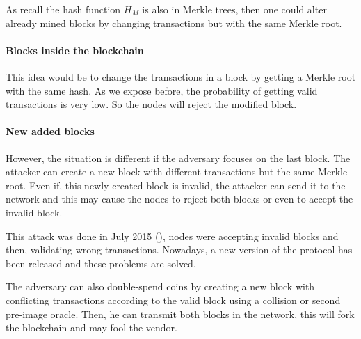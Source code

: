 As recall the hash function $H_M$ is also in Merkle trees, then one could alter already mined blocks by changing transactions but with the same Merkle root.

    \paragraph{Blocks inside the blockchain}

This idea would be to change the transactions in a block by getting a Merkle root with the same hash. As we expose before, the probability of getting valid transactions is very low. So the nodes will reject the modified block.

    \paragraph{New added blocks}

However, the situation is different if the adversary focuses on the last block. The attacker can create a new block with different transactions but the same Merkle root. Even if, this newly created block is invalid, the attacker can send it to the network and this may cause the nodes to reject both blocks or even to accept the invalid block.

This attack was done in July 2015 (\cite{mining_attack}), nodes were accepting invalid blocks and then, validating wrong transactions. Nowadays, a new version of the protocol has been released and these problems are solved. \newline

The adversary can also double-spend coins by creating a new block with conflicting transactions according to the valid block using a collision or second pre-image oracle. Then, he can transmit both blocks in the network, this will fork the blockchain and may fool the vendor.
